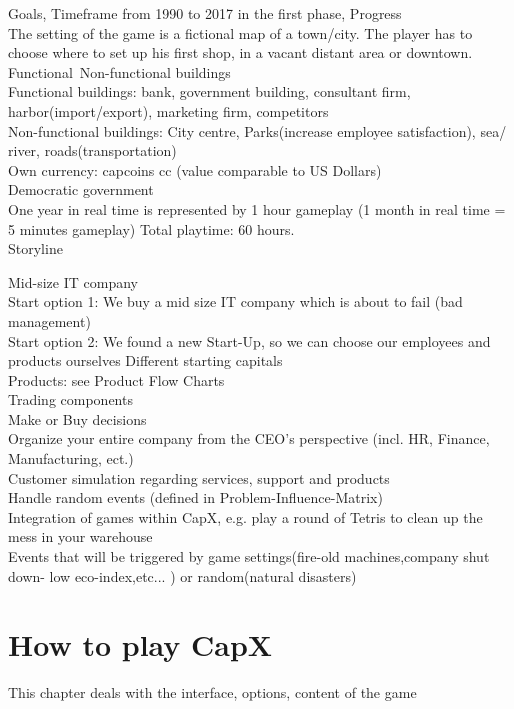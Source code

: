 \documentclass[11pt,titlepage,oneside,openany]{book}
\begin{document}
Goals, Timeframe from 1990 to 2017 in the first phase, Progress \\
The setting of the game is a fictional map of a town/city.  The player has to choose where to set up his first shop, in a vacant distant area or downtown. \\
Functional\ Non-functional buildings\\
Functional buildings: bank, government building, consultant firm, harbor(import/export), marketing firm, competitors \\
Non-functional buildings: City centre, Parks(increase employee satisfaction), sea/ river, roads(transportation)\\
Own currency: capcoins cc (value comparable to US Dollars) \\
Democratic government \\
One year in real time is represented by 1 hour gameplay (1 month in real time = 5 minutes gameplay)
Total playtime: 60 hours.\\

Storyline 

Mid-size IT company\\
Start option 1: We buy a mid size IT company which is about to fail 
(bad management)\\
Start option 2: We found a new Start-Up, so we can choose our employees and products ourselves
Different starting capitals\\
Products: see Product Flow Charts\\
Trading components\\
Make or Buy decisions\\
Organize your entire company from the CEO's perspective 
(incl. HR, Finance, Manufacturing, ect.)\\
Customer simulation regarding services, support and products \\
Handle random events (defined in Problem-Influence-Matrix)\\
Integration of games within CapX, e.g. play a round of Tetris to clean up the mess  in your warehouse\\
Events that will be triggered by game settings(fire-old machines,company shut down- low eco-index,etc... ) or random(natural disasters)




\chapter{How to play CapX}
\label{cha:theory}
 This chapter deals with the interface, options, content of the game
\end{document}
